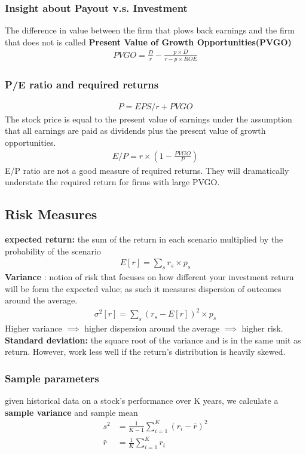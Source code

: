 \documentclass{article}
\theoremstyle{definition}
\theoremstyle{thrm}
\theoremstyle{lma}
\theoremstyle{ppst}
\theoremstyle{crlr}
\begin{document}
\subsubsection{Insight about Payout v.s. Investment}
The difference in value between the firm that plows back earnings and the firm that does not is called \textbf{Present Value of Growth Opportunities(PVGO)}
\begin{align*}
	PVGO = \frac{D}{r}-\frac{p\times D}{r-p\times ROE}
\end{align*}
\subsubsection{P/E ratio and required returns}

\begin{align*}
	P = EPS/r +PVGO
\end{align*}
The stock price is equal to the present value of earnings under the assumption that all earnings are paid as dividends plus the present value of growth opportunities.
\begin{align*}
	E/P = r\times (1-\frac{PVGO}{P})
\end{align*}
E/P ratio are not a good measure of required returns. They will dramatically understate the required return for firms with large PVGO.

\subsection{Risk Measures}
\textbf{expected return:} the sum of the return in each scenario multiplied by the probability of the scenario \\
\begin{align*}
	E[r] = \sum_s r_s\times p_s
\end{align*}
\textbf{Variance }: notion of risk that focuses on how different your investment return will be form the expected value; as such it measures dispersion of outcomes around the average.
\begin{align*}
	\sigma^2[r] = \sum_s(r_s-E[r])^2\times p_s
\end{align*}
Higher variance $\implies$ higher dispersion around the average $\implies$ higher risk.\\
\textbf{Standard deviation:} the square root of the variance and is in the same unit as return. However, work less well if the return's distribution is heavily skewed. 
\subsubsection{Sample parameters}
given historical data on a stock's performance over K years, we calculate a \textbf{sample variance} and sample mean
\begin{align*}
	s^2&= \frac{1}{K-1}\sum_{i=1}^K(r_i-\bar{r})^2\\
	\bar{r} &= \frac{1}{K}\sum_{i=1}^K r_i
\end{align*}
\end{document}
